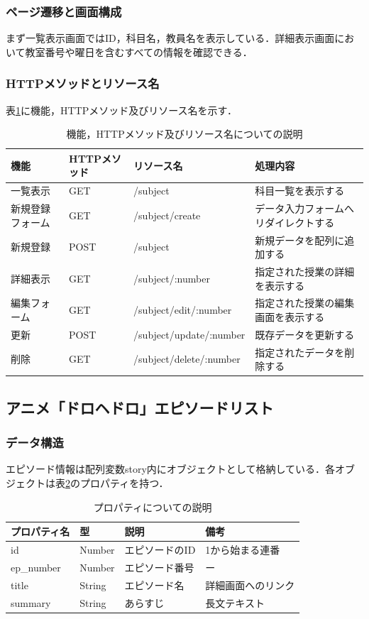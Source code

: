 \documentclass[uplatex,dvipdfmx]{jlreq}
\begin{document}
\subsubsection{ページ遷移と画面構成}
まず一覧表示画面ではID，科目名，教員名を表示している．詳細表示画面において教室番号や曜日を含むすべての情報を確認できる．

\subsubsection{HTTPメソッドとリソース名}
表\ref{tb:subject2}に機能，HTTPメソッド及びリソース名を示す．

\begin{table}[htbp]
  \centering
  \begin{tabularx}{\textwidth}{|l|l|l|X|} \hline
    機能 & HTTPメソッド & リソース名 & 処理内容 \\ \hline\hline
    一覧表示 & GET & /subject & 科目一覧を表示する \\ \hline
    新規登録フォーム & GET & /subject/create & データ入力フォームへリダイレクトする \\ \hline
    新規登録 & POST & /subject & 新規データを配列に追加する \\ \hline
    詳細表示 & GET & /subject/:number & 指定された授業の詳細を表示する \\ \hline
    編集フォーム & GET & /subject/edit/:number & 指定された授業の編集画面を表示する \\ \hline
    更新 & POST & /subject/update/:number & 既存データを更新する \\ \hline
    削除 & GET & /subject/delete/:number & 指定されたデータを削除する \\ \hline
  \end{tabularx}
  \caption{機能，HTTPメソッド及びリソース名についての説明}
  \label{tb:subject2}
\end{table}

\subsection{アニメ「ドロヘドロ」エピソードリスト}
\subsubsection{データ構造}
エピソード情報は配列変数story内にオブジェクトとして格納している．各オブジェクトは表\ref{tb:story}のプロパティを持つ．

\begin{table}[htbp]
  \centering
  \begin{tabular}{l|l|l|l}
    プロパティ名 & 型 & 説明 & 備考 \\ \hline\hline
    id & Number & エピソードのID & 1から始まる連番 \\ \hline
    ep\_number & Number & エピソード番号 & ー \\ \hline
    title & String & エピソード名 & 詳細画面へのリンク \\ \hline
    summary & String & あらすじ & 長文テキスト \\ \hline
  \end{tabular}
  \caption{プロパティについての説明}
  \label{tb:story}
\end{table}
\end{document}
